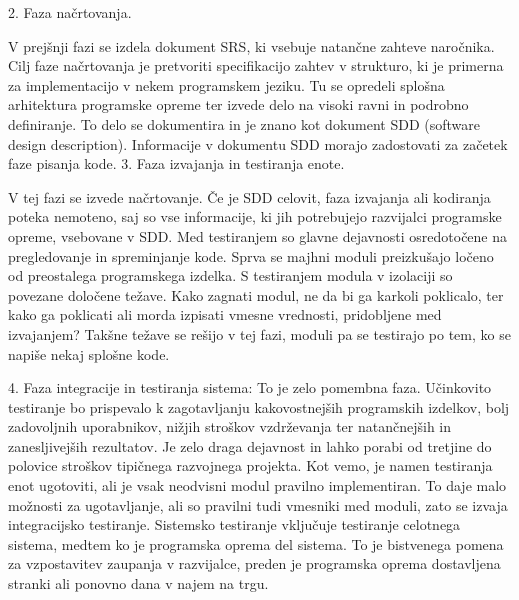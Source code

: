 \documentclass[a4paper,12pt,openright]{book}
\begin{document}
2. Faza načrtovanja.

 V prejšnji fazi se izdela dokument SRS, ki vsebuje natančne zahteve naročnika. Cilj faze načrtovanja je pretvoriti specifikacijo zahtev v strukturo, ki je primerna za implementacijo v nekem programskem jeziku. Tu se opredeli splošna arhitektura programske opreme ter izvede delo na visoki ravni in podrobno deﬁniranje. To delo se dokumentira in je znano kot dokument SDD (software design description). Informacije v dokumentu SDD morajo zadostovati za začetek faze pisanja kode.
3. Faza izvajanja in testiranja enote.

V tej fazi se izvede načrtovanje. Če je SDD celovit, faza izvajanja ali kodiranja poteka nemoteno, saj so vse informacije, ki jih potrebujejo razvijalci programske opreme, vsebovane v SDD.
Med testiranjem so glavne dejavnosti osredotočene na pregledovanje in spreminjanje kode. Sprva se majhni moduli preizkušajo ločeno od preostalega programskega izdelka. S testiranjem modula v izolaciji so povezane določene težave. Kako zagnati modul, ne da bi ga karkoli poklicalo, ter kako ga poklicati ali morda izpisati vmesne vrednosti, pridobljene med izvajanjem? Takšne težave se rešijo v tej fazi, moduli pa se testirajo po tem, ko se napiše nekaj splošne kode.


4. Faza integracije in testiranja sistema: 
 To je zelo pomembna faza. Učinkovito testiranje bo prispevalo k zagotavljanju kakovostnejših programskih izdelkov, bolj zadovoljnih uporabnikov, nižjih stroškov vzdrževanja ter natančnejših in zanesljivejših rezultatov. Je zelo draga dejavnost in lahko porabi od tretjine do polovice stroškov tipičnega razvojnega projekta.
Kot vemo, je namen testiranja enot ugotoviti, ali je vsak neodvisni modul pravilno implementiran. To daje malo možnosti za ugotavljanje, ali so pravilni tudi vmesniki med moduli, zato se izvaja integracijsko testiranje. Sistemsko testiranje vključuje testiranje celotnega sistema, medtem ko je programska oprema del sistema. To je bistvenega pomena za vzpostavitev zaupanja v razvijalce, preden je programska oprema dostavljena stranki ali ponovno dana v najem na trgu.
\end{document}
